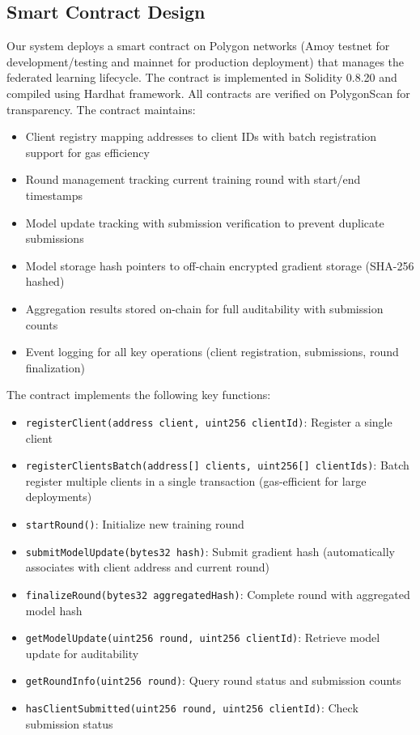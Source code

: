 \documentclass[runningheads]{llncs}
\begin{document}
\subsection{Smart Contract Design}

Our system deploys a smart contract on Polygon networks (Amoy testnet for development/testing and mainnet for production deployment) that manages the federated learning lifecycle. The contract is implemented in Solidity 0.8.20 and compiled using Hardhat framework. All contracts are verified on PolygonScan for transparency. The contract maintains:

\begin{itemize}
\item Client registry mapping addresses to client IDs with batch registration support for gas efficiency
\item Round management tracking current training round with start/end timestamps
\item Model update tracking with submission verification to prevent duplicate submissions
\item Model storage hash pointers to off-chain encrypted gradient storage (SHA-256 hashed)
\item Aggregation results stored on-chain for full auditability with submission counts
\item Event logging for all key operations (client registration, submissions, round finalization)
\end{itemize}

The contract implements the following key functions:
\begin{itemize}
\item \texttt{registerClient(address client, uint256 clientId)}: Register a single client
\item \texttt{registerClientsBatch(address[] clients, uint256[] clientIds)}: Batch register multiple clients in a single transaction (gas-efficient for large deployments)
\item \texttt{startRound()}: Initialize new training round
\item \texttt{submitModelUpdate(bytes32 hash)}: Submit gradient hash (automatically associates with client address and current round)
\item \texttt{finalizeRound(bytes32 aggregatedHash)}: Complete round with aggregated model hash
\item \texttt{getModelUpdate(uint256 round, uint256 clientId)}: Retrieve model update for auditability
\item \texttt{getRoundInfo(uint256 round)}: Query round status and submission counts
\item \texttt{hasClientSubmitted(uint256 round, uint256 clientId)}: Check submission status
\end{itemize}
\end{document}
